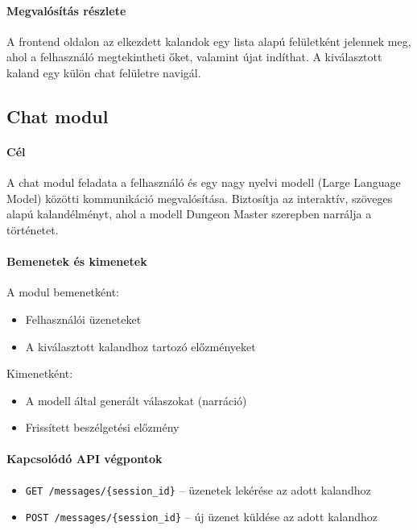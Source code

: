 \documentclass[
]{thesis-ekf}
\theoremstyle{definition}
\theoremstyle{remark}
\begin{document}
\paragraph{Megvalósítás részlete}

A frontend oldalon az elkezdett kalandok egy lista alapú felületként jelennek meg, ahol a felhasználó megtekintheti őket, valamint újat indíthat. A kiválasztott kaland egy külön chat felületre navigál.

\subsection{Chat modul}

\paragraph{Cél}

A chat modul feladata a felhasználó és egy nagy nyelvi modell (Large Language Model) közötti kommunikáció megvalósítása. Biztosítja az interaktív, szöveges alapú kalandélményt, ahol a modell Dungeon Master szerepben narrálja a történetet.

\paragraph{Bemenetek és kimenetek}

A modul bemenetként:
\begin{itemize}
    \item Felhasználói üzeneteket
    \item A kiválasztott kalandhoz tartozó előzményeket
\end{itemize}

Kimenetként:
\begin{itemize}
    \item A modell által generált válaszokat (narráció)
    \item Frissített beszélgetési előzmény
\end{itemize}

\paragraph{Kapcsolódó API végpontok}
\begin{itemize}
    \item \texttt{GET /messages/\{session\_id\}} – üzenetek lekérése az adott kalandhoz
    \item \texttt{POST /messages/\{session\_id\}} – új üzenet küldése az adott kalandhoz
\end{itemize}
\end{document}
